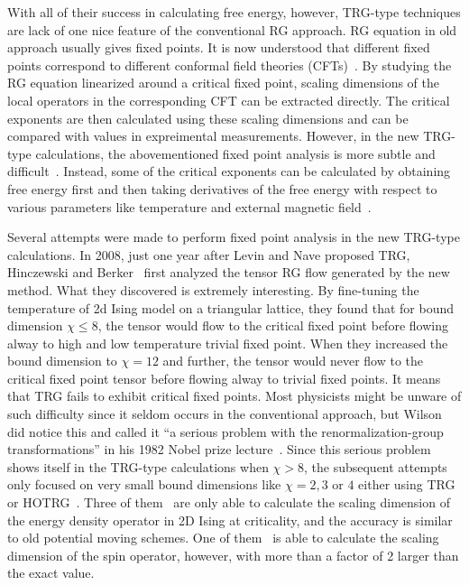 \documentclass[aps,prb,reprint,superscriptaddress]{revtex4-2}
\begin{document}
With all of their success in calculating free energy, however, TRG-type
techniques are lack of one nice feature of the conventional RG approach.
RG equation in old approach usually gives fixed points. It is now
understood that different fixed points correspond to different conformal
field theories (CFTs)~\cite{polchinski1988,nakayama2015}. By studying
the RG equation linearized around a critical fixed point, scaling
dimensions of the local operators in the corresponding CFT can be
extracted directly. The critical exponents are then calculated using
these scaling dimensions and can be compared with values in expreimental
measurements. However, in the new TRG-type calculations, the
abovementioned fixed point analysis is more subtle and
difficult~\cite{kadanoff2014}.  Instead, some of the critical exponents
can be calculated by obtaining free energy first and then taking
derivatives of the free energy with respect to various parameters like
temperature and external magnetic field~\cite{hotrg,
Berker2008,xiang2019adtrg}. 
%

Several attempts were made to perform fixed point analysis in the new
TRG-type calculations. In 2008, just one year after Levin and Nave
proposed TRG, Hinczewski and Berker~\cite{Berker2008} first analyzed the
tensor RG flow generated by the new method. What they discovered is
extremely interesting.  By fine-tuning the temperature of 2d Ising model
on a triangular lattice, they found that for bound dimension $\chi \leq
8$, the tensor would flow to the critical fixed point before flowing
alway to high and low temperature trivial fixed point. When they
increased the bound dimension to $\chi =  12$ and further, the tensor
would never flow to the critical fixed point tensor before flowing alway
to trivial fixed points. It means that TRG fails to exhibit critical
fixed points. Most physicists might be unware of such difficulty since
it seldom occurs in the conventional approach, but Wilson did notice
this and called it ``a serious problem with the renormalization-group
transformations'' in his 1982 Nobel prize lecture~\cite{wilsonNobel}.
Since this serious problem shows itself in the TRG-type calculations
when $\chi > 8$, the subsequent attempts only focused on very small
bound dimensions like $\chi = 2, 3$ or $4$ either using
TRG~\cite{kadanoff2014,aoki2009} or HOTRG~\cite{meurice2013}. Three of
them~\cite{Berker2008,aoki2009,meurice2013} are only able to calculate
the scaling dimension of the energy density operator in 2D Ising at
criticality, and the accuracy is similar to old potential moving
schemes. One of them~\cite{kadanoff2014} is able to calculate the
scaling dimension of the spin operator, however, with more than a factor
of 2 larger than the exact value. 
%
\end{document}

